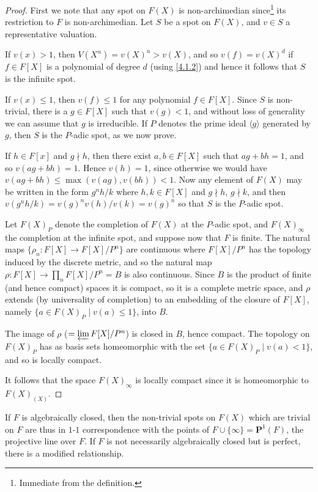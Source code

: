 \documentclass[10pt]{article}
\theoremstyle{definition}
\def\<{\langle}
\def\>{\rangle}
\def\PP{\mathbf{P}}
\def\fnthni{Immediate from the definition.}
\begin{document}
\begin{proof}
First we note that any spot on $F(X)$ is non-archimedian since\footnote{\fnthni} its restriction to $F$ is non-archimedian.
Let $S$ be a spot on $F(X)$, and $v \in S$ a representative valuation.

If $v(x) > 1$, then $V(X^n) = v(X)^n > v(X)$, and so $v(f) = v(X)^d$ if $f \in F[X]$ is a polynomial of degree $d$ (using \ref{4.1.2}) and hence it follows that $S$ is the infinite spot.

If $v(x) \leq 1$, then $v(f) \leq 1$ for any polynomial $f \in F[X]$.
Since $S$ is non-trivial, there is a $g \in F[X]$ such that $v(g) < 1$, and without loss of generality we can assume that $g$ is irreducible.
If $P$ denotes the prime ideal $\< g \>$ generated by $g$, then $S$ is the $P$-adic spot, as we now prove.

If $h \in F[x]$ and $g \nmid h$, then there exist $a,b \in F[X]$ such that $ag + bh = 1$, and so $v(ag + bh) = 1$.
Hence $v(h) = 1$, since otherwise we would have $v(ag + bh) \leq \max(v(ag), v(bh)) < 1$.
Now any element of $F(X)$ may be written in the form $g^nh/k$ where $h,k \in F[X]$ and $g \nmid h$, $g \nmid k$, and then $v(g^nh/k) = v(g)^n v(h) / v(k) = v(g)^n$ so that $S$ is the $P$-adic spot.

Let $F(X)_P$ denote the completion of $F(X)$ at the $P$-adic spot, and $F(X)_\infty$ the completion at the infinite spot, and suppose now that $F$ is finite.
The natural maps $\{ \rho_n : F[X] \to F[X]/P^n\}$ are continuous where $F[X]/P^n$ has the topology induced by the discrete metric, and so the natural map $\rho : F[X] \to \prod_{n} F[X] / P^n = B$ is also continuous.
Since $B$ is the product of finite (and hence compact) spaces it is compact, so it is a complete metric space, and $\rho$ extends (by universality of completion) to an embedding of the closure of $F[X]$, namely $\{ a \in F(X)_P \mid v(a) \leq 1\}$, into $B$.

The image of $\rho$ ($= \varprojlim F[X] / P^n$) is closed in $B$, hence compact.
The topology on $F(X)_P$ has as basis sets homeomorphic with the set $\{a \in F(X)_P \mid v(a) < 1 \}$, and so is locally compact.

It follows that the space $F(X)_\infty$ is locally compact since it is homeomorphic to $F(X)_{(X)}$.
\end{proof}


If $F$ is algebraically closed, then the non-trivial spots on $F(X)$ which are trivial on $F$ are thus in $1$-$1$ correspondence with the points of $F \cup \{\infty\} = \PP^1(F)$, the projective line over $F$.
If $F$ is not necessarily algebraically closed but is perfect, there is a modified relationship.
\end{document}

